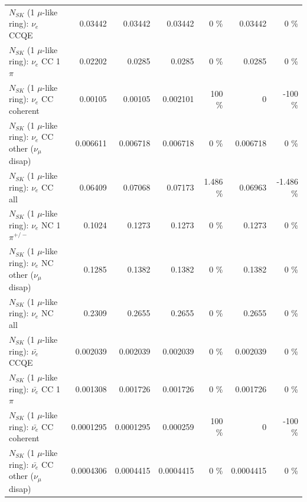 \begin{table}
\begin{tabular}{| l | r | r | r  r | r  r |}
\hline
\hline
\hline
                                      $N_{SK}$ (1 $\mu$-like ring): $\nu_e$ CCQE &         0.03442 &         0.03442 &         0.03442 &        0 \%  &         0.03442 &        0 \%  \\ 
                                 $N_{SK}$ (1 $\mu$-like ring): $\nu_e$ CC 1$\pi$ &         0.02202 &          0.0285 &          0.0285 &        0 \%  &          0.0285 &        0 \%  \\ 
                               $N_{SK}$ (1 $\mu$-like ring): $\nu_e$ CC coherent &         0.00105 &         0.00105 &        0.002101 &      100 \%  &               0 &     -100 \%  \\ 
                $N_{SK}$ (1 $\mu$-like ring): $\nu_e$ CC other ($\nu_\mu$ disap) &        0.006611 &        0.006718 &        0.006718 &        0 \%  &        0.006718 &        0 \%  \\ 
                                  $N_{SK}$ (1 $\mu$-like ring): $\nu_{e}$ CC all &         0.06409 &         0.07068 &         0.07173 &    1.486 \%  &         0.06963 &   -1.486 \%  \\ 
\hline
                           $N_{SK}$ (1 $\mu$-like ring): $\nu_e$ NC 1$\pi^{+/-}$ &          0.1024 &          0.1273 &          0.1273 &        0 \%  &          0.1273 &        0 \%  \\ 
                $N_{SK}$ (1 $\mu$-like ring): $\nu_e$ NC other ($\nu_\mu$ disap) &          0.1285 &          0.1382 &          0.1382 &        0 \%  &          0.1382 &        0 \%  \\ 
                                  $N_{SK}$ (1 $\mu$-like ring): $\nu_{e}$ NC all &          0.2309 &          0.2655 &          0.2655 &        0 \%  &          0.2655 &        0 \%  \\ 
\hline
\hline
\hline
                                $N_{SK}$ (1 $\mu$-like ring): $\bar{\nu_e}$ CCQE &        0.002039 &        0.002039 &        0.002039 &        0 \%  &        0.002039 &        0 \%  \\ 
                           $N_{SK}$ (1 $\mu$-like ring): $\bar{\nu_e}$ CC 1$\pi$ &        0.001308 &        0.001726 &        0.001726 &        0 \%  &        0.001726 &        0 \%  \\ 
                         $N_{SK}$ (1 $\mu$-like ring): $\bar{\nu_e}$ CC coherent &       0.0001295 &       0.0001295 &        0.000259 &      100 \%  &               0 &     -100 \%  \\ 
          $N_{SK}$ (1 $\mu$-like ring): $\bar{\nu_e}$ CC other ($\nu_\mu$ disap) &       0.0004306 &       0.0004415 &       0.0004415 &        0 \%  &       0.0004415 &        0 \%  \\ 

\end{tabular}
\end{table}
